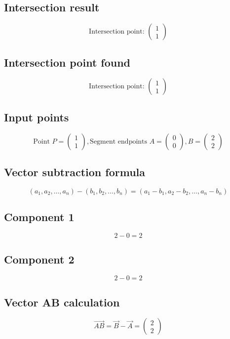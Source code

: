 \documentclass{article}
\begin{document}
\subsection*{ \vspace{1em} Intersection result}
\[
\text{Intersection point: } \begin{pmatrix}1 \\ 1\end{pmatrix}
\]
\subsection*{ \vspace{1em} Intersection point found}
\[
\text{Intersection point: } \begin{pmatrix}1 \\ 1\end{pmatrix}
\]
\subsection*{ \vspace{1em} Input points}
\[
\text{Point } P = \begin{pmatrix}1 \\ 1\end{pmatrix},
      \text{Segment endpoints } A = \begin{pmatrix}0 \\ 0\end{pmatrix}, B = \begin{pmatrix}2 \\ 2\end{pmatrix}
\]
\subsection*{ \vspace{1em} Vector subtraction formula}
\[
(a_1, a_2, \dots, a_n) - (b_1, b_2, \dots, b_n) = (a_1 - b_1, a_2 - b_2, \dots, a_n - b_n)
\]
\subsection*{ \vspace{1em} Component 1}
\[
2 - 0 = 2
\]
\subsection*{ \vspace{1em} Component 2}
\[
2 - 0 = 2
\]
\subsection*{ \vspace{1em} Vector AB calculation}
\[
\vec{AB} = \vec{B} - \vec{A} = \begin{pmatrix}2 \\ 2\end{pmatrix}
\]
\end{document}
